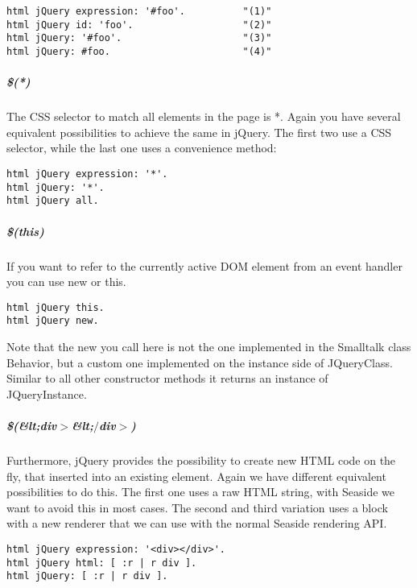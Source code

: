 \documentclass[a4paper,10pt,twoside]{book}
\newcommand{\ct}[1]{{\small\ttfamily\textup{#1}}}
\begin{document}
\begin{lstlisting}
html jQuery expression: '#foo'.          "(1)"
html jQuery id: 'foo'.                   "(2)"
html jQuery: '#foo'.                     "(3)"
html jQuery: #foo.                       "(4)"
\end{lstlisting}

\subparagraph*{ \$(*)}
\label{book:web20:jquery:basics:creatingqueries:155101574}
 The CSS selector to match all elements in the page is \ct{*}. Again you have several equivalent possibilities to achieve the same in jQuery. The first two use a CSS selector, while the last one uses a convenience method:

\begin{lstlisting}
html jQuery expression: '*'.
html jQuery: '*'.
html jQuery all.
\end{lstlisting}

\subparagraph*{ \$(this)}
\label{book:web20:jquery:basics:creatingqueries:86633780}
  If you want to refer to the  currently active DOM element from an event handler you can use \ct{new} or \ct{this}. 

\begin{lstlisting}
html jQuery this.
html jQuery new.
\end{lstlisting}

Note that the \ct{new} you call here is not the one implemented in the Smalltalk class \ct{Behavior}, but a custom one implemented on the instance side of \ct{JQueryClass}. Similar to all other constructor methods it returns an instance of \ct{JQueryInstance}.

\subparagraph*{ \$(\&lt;div$>$\&lt;$/$div$>$)}
\label{book:web20:jquery:basics:creatingqueries:186068995}
 Furthermore, jQuery provides the possibility to create new HTML code on the fly, that inserted into an existing element. Again we have different equivalent possibilities to do this. The first one uses a raw HTML string, with Seaside we want to avoid this in most cases. The second and third variation uses a block with a new renderer that we can use with the normal Seaside rendering API.

\begin{lstlisting}
html jQuery expression: '<div></div>'.
html jQuery html: [ :r | r div ].
html jQuery: [ :r | r div ].
\end{lstlisting}
\end{document}
